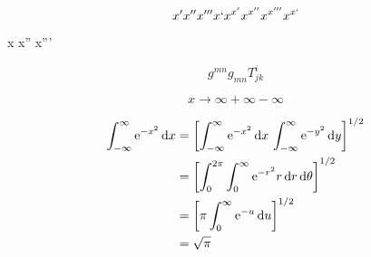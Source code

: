\documentclass{article}
\begin{document}
\[ x' x'' x''' x` x^{x'} x^{x''} x^{x'''} x^{x`}\]

{\firatext x x'' x'''}

\[ g^{mn} g_{mn} T^{i}_{jk} \]

\[ x \to \infty + \infty - \infty \]

\def\ee{\mathrm{e}}
\begin{align*}
     \int_{-\infty}^\infty \ee^{-x^2} \dd{x}
  &= \qty[\int_{-\infty}^\infty \ee^{-x^2} \dd{x} \, \int_{-\infty}^\infty \ee^{-y^2} \dd{y}]^{1/2} \\
  &= \qty[\int_0^{2\pi} \int_0^\infty \ee^{-r^2} r \dd{r}\dd{\theta}]^{1/2} \\
  &= \qty[\pi \int_0^\infty \ee^{-u} \dd{u}]^{1/2} \\
  &= \sqrt{\pi}
\end{align*}
\end{document}

